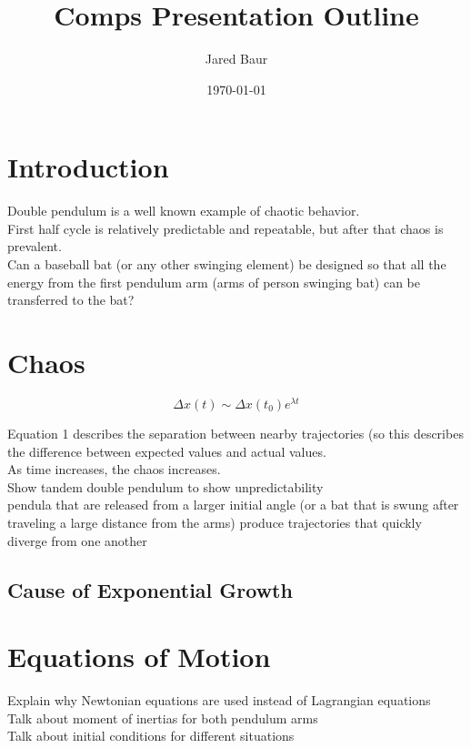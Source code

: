 \documentclass[%
 aip,
rsi,%
 reprint,%
]{revtex4-1}
\begin{document}
\title{Comps Presentation Outline} %
\author{Jared Baur}
\date{\today}

\maketitle

\section{Introduction}
Double pendulum is a well known example of chaotic behavior.\\
\indent First half cycle is relatively predictable and repeatable, but after that chaos is prevalent.\\
\indent Can a baseball bat (or any other swinging element) be designed so that all the energy from the first pendulum arm (arms of person swinging bat) can be transferred to the bat?

\section{Chaos\cite{Shinbrot1992}}

\begin{equation}
	\Delta x(t) \sim \Delta x(t_0) e^{\lambda t}
\end{equation}

Equation 1 describes the separation between nearby trajectories (so this describes the difference between expected values and actual values.\\
\indent As time increases, the chaos increases.\\
\indent Show tandem double pendulum to show unpredictability\\
\indent pendula that are released from a larger initial angle (or a bat that is swung after traveling a large distance from the arms) produce trajectories that quickly diverge from one another

\subsection{Cause of Exponential Growth}

\section{Equations of Motion}
Explain why Newtonian equations are used instead of Lagrangian equations\\
\indent Talk about moment of inertias for both pendulum arms\\
\indent Talk about initial conditions for different situations
\end{document}
